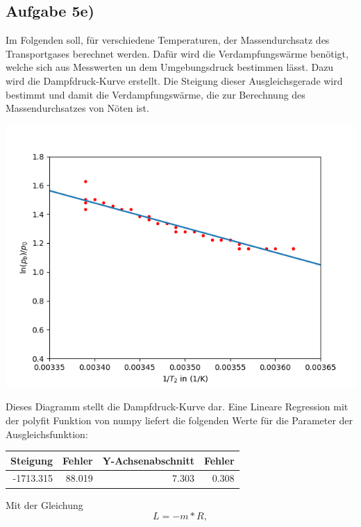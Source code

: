 \documentclass[titlepage=firstcover, captions=tableheading]{scrartcl}
\begin{document}
\subsection{Aufgabe 5e)}

Im Folgenden soll, für verschiedene Temperaturen, der Massendurchsatz des Transportgases berechnet werden.
Dafür wird die Verdampfungswärme benötigt, welche sich aus Messwerten un dem Umgebungsdruck bestimmen lässt.
Dazu wird die Dampfdruck-Kurve erstellt. 
Die Steigung dieser Ausgleichsgerade wird bestimmt und damit die Verdampfungswärme, die zur Berechnung des Massendurchsatzes von Nöten ist.

\begin{center}
    \includegraphics{massendurchsatz.png}
\end{center}
Dieses Diagramm stellt die Dampfdruck-Kurve dar.
Eine Lineare Regression mit der polyfit Funktion von numpy liefert die folgenden Werte für die Parameter der Ausgleichsfunktion: 
\begin{center}
    \begin{tabular}{r@{${}\pm{}$}rr@{${}\pm{}$}r}
        \toprule
        {Steigung} & {Fehler} & {Y-Achsenabschnitt} & {Fehler} \\
        \midrule
        -1713.315 & 88.019 & 7.303 & 0.308 \\
        \bottomrule
        
    \end{tabular}
\end{center}
Mit der Gleichung 
\begin{displaymath}
    L = -m*R ,
\end{displaymath}
\end{document}
